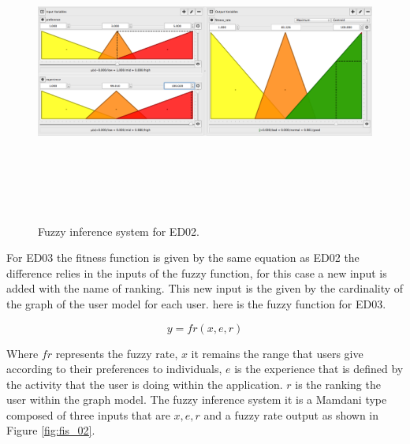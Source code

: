 \begin{figure}
\captionsetup{justification=centering,margin=2cm}
\centering
\setlength\fboxsep{0pt}
\setlength\fboxrule{0.7pt}
\includegraphics[width=12cm,height=10cm,keepaspectratio]{img/fuzzy_system_2_1.png}
\caption{Fuzzy inference system for ED02.}
\label{fig:fis_01}
\end{figure}

For ED03 the fitness function is given by the same equation as ED02 the
difference relies in the inputs of the fuzzy function, for this case a new input
is added with the name of ranking. This new input is the given by the
cardinality of the graph of the user model for each user. here is the fuzzy
function for ED03.

\begin{equation}\label{eq:fuzzyFunc2}
\displaystyle y=fr(x,e,r)
\end{equation}

Where $fr$ represents the fuzzy rate,
$x$ it remains the range that users give according to their preferences to individuals,
$e$  is the experience that is defined by the
activity that the user is doing within the application.
$r$ is the ranking the user within the graph model.
 The fuzzy inference system it is a Mamdani type composed of three inputs that
are  $x,e, r$ and a fuzzy rate output as shown in Figure \ref{fig:fis_02}.

